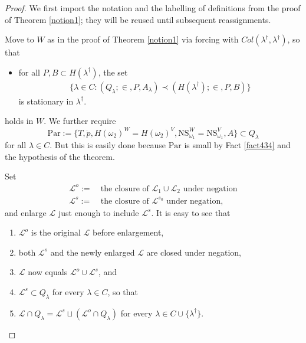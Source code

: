 \documentclass[12pt, twoside]{memoir}
\numberwithin{equation}{section}
\theoremstyle{definition}
\theoremstyle{remark}
\theoremstyle{definition}
\theoremstyle{definition}
\theoremstyle{definition}
\theoremstyle{remark}
\begin{document}
\begin{proof}
We first import the notation and the labelling of definitions from the proof of Theorem \ref{notion1}; they will be reused until subsequent reassignments. 

Move to $W$ as in the proof of Theorem \ref{notion1} via forcing with $Col(\lambda^{\dagger}, \lambda^{\dagger})$, so that 
\begin{itemize}[label=($\diamond$)]
    \item for all $P, B \subset H(\lambda^{\dagger})$, the set
    \begin{align*}
        \{\lambda \in C : (Q_{\lambda}; \in, P, A_{\lambda}) \prec (H(\lambda^{\dagger}); \in, P, B)\}
    \end{align*}
    is stationary in $\lambda^{\dagger}$.
\end{itemize}
holds in $W$. We further require 
\begin{equation*}
    \mathrm{Par} := \{T, \dot{p}, H(\omega_2)^W = H(\omega_2)^V, \mathrm{NS}_{\omega_1}^W = \mathrm{NS}_{\omega_1}^V, A\} \subset Q_{\lambda}
\end{equation*}
for all $\lambda \in C$. But this is easily done because $\mathrm{Par}$ is small by Fact \ref{fact434} and the hypothesis of the theorem. 

Set
\begin{align*}
    \mathcal{L}^o := \ & \text{the closure of } \mathcal{L}_1 \cup \mathcal{L}_2 \text{ under negation} \\
    \mathcal{L}^s := \ & \text{the closure of } \mathcal{L}^{s_0} \text{ under negation},
\end{align*}
and enlarge $\mathcal{L}$ just enough to include $\mathcal{L}^s$. It is easy to see that
\begin{enumerate}[label=(\Alph*)]
    \item\label{33a} $\mathcal{L}^o$ is the original $\mathcal{L}$ before enlargement,
    \item both $\mathcal{L}^s$ and the newly enlarged $\mathcal{L}$ are closed under negation, 
    \item $\mathcal{L}$ now equals $\mathcal{L}^o \cup \mathcal{L}^s$, and
    \item $\mathcal{L}^s \subset Q_{\lambda}$ for every $\lambda \in C$, so that
    \item $\mathcal{L} \cap Q_{\lambda} = \mathcal{L}^s \sqcup (\mathcal{L}^o \cap Q_{\lambda})$ for every $\lambda \in C \cup \{\lambda^{\dagger}\}$.
\end{enumerate}


\end{proof}
\end{document}
